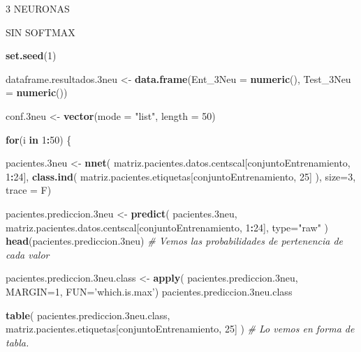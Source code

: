 \documentclass[]{article}
\newenvironment{Shaded}{\begin{snugshade}}{\end{snugshade}}
\newcommand{\CommentTok}[1]{\textcolor[rgb]{0.56,0.35,0.01}{\textit{#1}}}
\newcommand{\ControlFlowTok}[1]{\textcolor[rgb]{0.13,0.29,0.53}{\textbf{#1}}}
\newcommand{\DataTypeTok}[1]{\textcolor[rgb]{0.13,0.29,0.53}{#1}}
\newcommand{\DecValTok}[1]{\textcolor[rgb]{0.00,0.00,0.81}{#1}}
\newcommand{\FloatTok}[1]{\textcolor[rgb]{0.00,0.00,0.81}{#1}}
\newcommand{\KeywordTok}[1]{\textcolor[rgb]{0.13,0.29,0.53}{\textbf{#1}}}
\newcommand{\NormalTok}[1]{#1}
\newcommand{\OperatorTok}[1]{\textcolor[rgb]{0.81,0.36,0.00}{\textbf{#1}}}
\newcommand{\StringTok}[1]{\textcolor[rgb]{0.31,0.60,0.02}{#1}}
\begin{document}
3 NEURONAS

SIN SOFTMAX

\begin{Shaded}
\begin{Highlighting}[]
\KeywordTok{set.seed}\NormalTok{(}\DecValTok{1}\NormalTok{)}

\NormalTok{dataframe.resultados}\FloatTok{.3}\NormalTok{neu <-}\StringTok{ }\KeywordTok{data.frame}\NormalTok{(}\DataTypeTok{Ent_3Neu =} \KeywordTok{numeric}\NormalTok{(),}
                                        \DataTypeTok{Test_3Neu =} \KeywordTok{numeric}\NormalTok{())}

\NormalTok{conf}\FloatTok{.3}\NormalTok{neu <-}\StringTok{ }\KeywordTok{vector}\NormalTok{(}\DataTypeTok{mode =} \StringTok{"list"}\NormalTok{, }\DataTypeTok{length =} \DecValTok{50}\NormalTok{)}

\ControlFlowTok{for}\NormalTok{(i }\ControlFlowTok{in} \DecValTok{1}\OperatorTok{:}\DecValTok{50}\NormalTok{)}
\NormalTok{\{}

\NormalTok{  pacientes}\FloatTok{.3}\NormalTok{neu <-}\StringTok{ }\KeywordTok{nnet}\NormalTok{( matriz.pacientes.datos.centscal[conjuntoEntrenamiento, }\DecValTok{1}\OperatorTok{:}\DecValTok{24}\NormalTok{],}
                          \KeywordTok{class.ind}\NormalTok{( matriz.pacientes.etiquetas[conjuntoEntrenamiento, }\DecValTok{25}\NormalTok{] ),}
                          \DataTypeTok{size=}\DecValTok{3}\NormalTok{,}
                          \DataTypeTok{trace =}\NormalTok{ F)}
  
\NormalTok{  pacientes.prediccion}\FloatTok{.3}\NormalTok{neu <-}\StringTok{ }\KeywordTok{predict}\NormalTok{( pacientes}\FloatTok{.3}\NormalTok{neu, matriz.pacientes.datos.centscal[conjuntoEntrenamiento, }\DecValTok{1}\OperatorTok{:}\DecValTok{24}\NormalTok{], }\DataTypeTok{type=}\StringTok{"raw"}\NormalTok{ )}
  \KeywordTok{head}\NormalTok{(pacientes.prediccion}\FloatTok{.3}\NormalTok{neu) }\CommentTok{# Vemos las probabilidades de pertenencia de cada valor}
  
  
\NormalTok{  pacientes.prediccion}\FloatTok{.3}\NormalTok{neu.class <-}\StringTok{ }\KeywordTok{apply}\NormalTok{( pacientes.prediccion}\FloatTok{.3}\NormalTok{neu, }\DataTypeTok{MARGIN=}\DecValTok{1}\NormalTok{, }\DataTypeTok{FUN=}\StringTok{'which.is.max'}\NormalTok{)}
\NormalTok{  pacientes.prediccion}\FloatTok{.3}\NormalTok{neu.class}
  
  
  \KeywordTok{table}\NormalTok{( pacientes.prediccion}\FloatTok{.3}\NormalTok{neu.class, matriz.pacientes.etiquetas[conjuntoEntrenamiento, }\DecValTok{25}\NormalTok{] )  }\CommentTok{# Lo vemos en forma de tabla.}
  

\end{Highlighting}
\end{Shaded}
\end{document}
